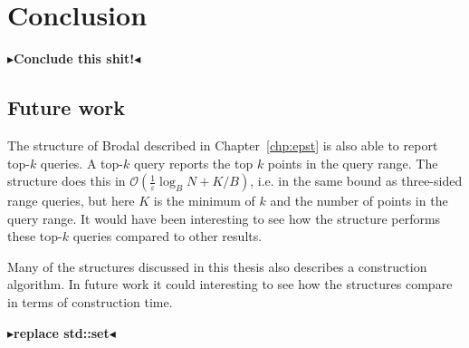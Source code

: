 \documentclass[twoside,11pt,openright]{report}
\def \epsilon {\varepsilon}
\newcommand{\todo}[1]{{\color[rgb]{.5,0,0}\textbf{$\blacktriangleright$#1$\blacktriangleleft$}}}
\begin{document}
\chapter{Conclusion}
\label{chp:conclusion}

\todo{Conclude this shit!}

\section{Future work}
The structure of Brodal described in Chapter~\ref{chp:epst} is also able to report top-$k$ queries. A top-$k$ query reports the top $k$ points in the query range. The structure does this in $\mathcal{O}(\frac{1}{\epsilon}\log_B N + K/B)$, i.e. in the same bound as three-sided range queries, but here $K$ is the minimum of $k$ and the number of points in the query range. It would have been interesting to see how the structure performs these top-$k$ queries compared to other results.

Many of the structures discussed in this thesis also describes a construction algorithm. In future work it could interesting to see how the structures compare in terms of construction time.

\todo{replace std::set}

\clearpage
{}

\end{document}
